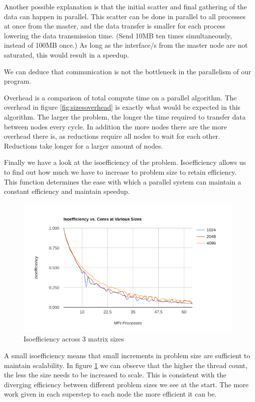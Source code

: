 \documentclass[a4paper,10pt]{report}
\begin{document}
Another possible explanation is that the initial scatter and final gathering of the data can happen in parallel. This scatter can be done in parallel to all processes at once from the master, and the data transfer is smaller for each process lowering the data transmission time. (Send 10MB ten times simultaneously, instead of 100MB once.) As long as the interface/s from the master node are not saturated, this would result in a speedup.

We can deduce that communication is not the bottleneck in the parallelism of our program.

Overhead is a comparison of total compute time on a parallel algorithm. The overhead in figure \ref{fig:sizesoverhead} is exactly what would be expected in this algorithm. The larger the problem, the longer the time required to transfer data between nodes every cycle. In addition the more nodes there are the more overhead there is, as reductions require all nodes to wait for each other. Reductions take longer for a larger amount of nodes.

Finally we have a look at the isoefficiency of the problem. Isoefficiency allows us to find out how much we have to increase to problem size to retain efficiency. This function determines the ease with which a parallel system can maintain a constant efficiency and maintain speedup.

\begin{figure}[!t]
 \centering
 \includegraphics[width=\textwidth]{./images/sizes-isoefficiency.png}
 \caption{Isoefficiency across 3 matrix sizes}
 \label{fig:sizesisoefficiency}
\end{figure}

A small isoefficiency means that small increments in problem size are sufficient to maintain scalability. In figure \ref{fig:sizesisoefficiency} we can observe that the higher the thread count, the less the size needs to be increased to scale. This is consistent with the diverging efficiency between different problem sizes we see at the start. The more work given in each superstep to each node the more efficient it can be.
\end{document}
